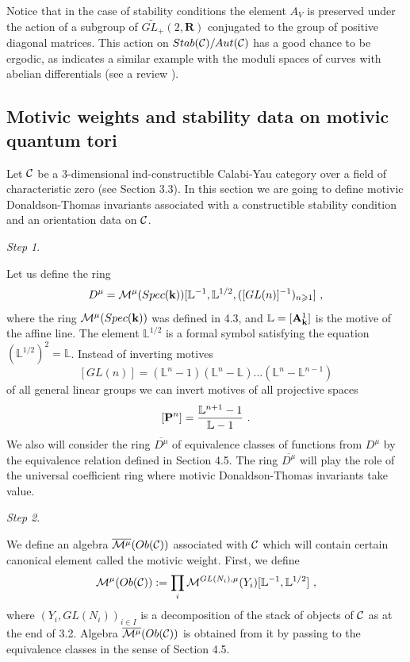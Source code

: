 \documentclass[12pt]{article}
\begin{document}
      Notice that in the case of stability conditions the element $A_V$ 
    is preserved under the action of a subgroup of $\widetilde{GL_+}(2,\mathbf{R})$ conjugated to the group
     of positive diagonal matrices. This action on $Stab({\cal C})/Aut({\cal C})$
     has a good chance to be ergodic,
     as indicates a similar example with the moduli spaces of 
    curves with abelian differentials (see a review \cite{Zo}).
    
    
\subsection{Motivic weights and stability data on motivic quantum tori}

Let ${\mathcal C}$ be a $3$-dimensional ind-constructible   Calabi-Yau category over a field of characteristic zero (see Section 3.3). 
In this section we are going to define motivic Donaldson-Thomas invariants associated with a constructible stability condition and an orientation data on ${\mathcal C}$.



{\it Step 1}. 

Let us define the ring
$${D}^{\mu}={\cal M}^{\mu}(Spec({\bf k}))[{\mathbb L}^{-1}, {\mathbb L}^{1/2},  ([GL(n)]^{-1})_{n\geqslant 1}]\,\,, $$
where  the ring ${\cal M}^{\mu}(Spec({\bf k}))$ was defined in 4.3, and ${\mathbb L}=[{\bf A}^1_{{\bf k}}]$ is the motive of the affine line. The element
${\mathbb L}^{1/2}$ is a formal symbol satisfying the equation $({\mathbb L}^{1/2})^2={\mathbb L}$. Instead of inverting motives $$[GL(n)]=({\mathbb L}^n-1)({\mathbb L}^n-{\mathbb L})\dots({\mathbb L}^n-{\mathbb L}^{n-1})$$ of all general linear groups we can invert motives of all projective spaces
$$[{\bf P}^n]={{\mathbb L}^{n+1}-1\over {\mathbb L}-1}\,\,.$$  
We also will consider the ring $\overline{D^{\mu}}$ of equivalence classes of functions from $D^{\mu}$ by the equivalence relation defined in Section 4.5. 
 The ring $\overline{D^{\mu}}$ will play the role of the universal coefficient ring where motivic Donaldson-Thomas invariants take value.




{\it Step 2}. 

We define an algebra $\overline{{\cal M}^{\mu}}(Ob({\mathcal C}))$ associated with ${\mathcal C}$ which will contain certain canonical element called the motivic weight.
First, we define 
$${\cal M}^{\mu}(Ob({\mathcal C})):=\prod_i{\cal M}^{GL(N_i),\mu}(Y_i)[{\mathbb L}^{-1}, {\mathbb L}^{1/2}]\,\,,$$
where $(Y_i, GL(N_i))_{i\in I}$ is a decomposition of the stack of objects of ${\mathcal C}$ as at the end of 3.2.
Algebra $\overline{{\cal M}^{\mu}}(Ob({\mathcal C}))$ is obtained from it by passing to the equivalence classes 
in the sense of Section 4.5. 
\end{document}
